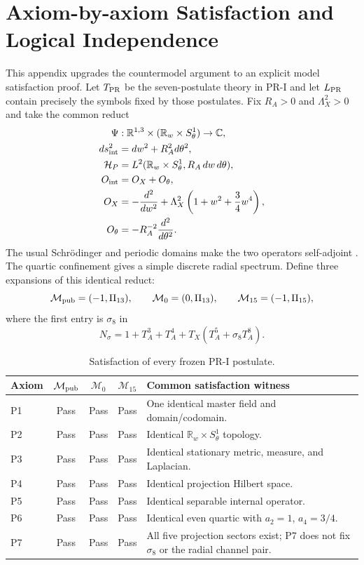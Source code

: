 \appendix
\section{Axiom-by-axiom Satisfaction and Logical Independence}
\label{app:axiom-by-axiom}

This appendix upgrades the countermodel argument to an explicit model
satisfaction proof.  Let $T_{\rm PR}$ be the seven-postulate theory in PR-I
and let $L_{\rm PR}$ contain precisely the symbols fixed by those postulates.
Fix $R_A>0$ and $\Lambda_X^2>0$ and take the common reduct
\begin{align}
 \Psi&:\mathbb R^{1,3}\times(\mathbb R_w\times S^1_\theta)\to\mathbb C,\\
 ds_{\rm int}^2&=dw^2+R_A^2d\theta^2,\\
 \mathcal H_P&=L^2(\mathbb R_w\times S^1_\theta,R_A\,dw\,d\theta),\\
 O_{\rm int}&=O_X+O_\theta,\\
 O_X&=-\frac{d^2}{dw^2}+\Lambda_X^2\left(1+w^2+\frac34w^4\right),\\
 O_\theta&=-R_A^{-2}\frac{d^2}{d\theta^2}.
\end{align}
The usual Schrödinger and periodic domains make the two operators self-adjoint \cite{ReedSimon_1975}.  The quartic confinement gives a simple discrete radial spectrum. Define three expansions of this identical reduct:
\begin{equation}
 \mathcal M_{\rm pub}=(-1,\Pi_{13}),\qquad
 \mathcal M_{0}=(0,\Pi_{13}),\qquad
 \mathcal M_{15}=(-1,\Pi_{15}),
\end{equation}
where the first entry is $\sigma_8$ in
\begin{equation}
 N_\sigma=1+T_A^3+T_A^4+T_X(T_A^5+\sigma_8T_A^8).
\end{equation}

\begin{table}[H]
\centering
\small
\caption{Satisfaction of every frozen PR-I postulate.}
\label{tab:axiom-satisfaction}
\begin{tabularx}{\textwidth}{@{}p{}c c c X@{}}
\toprule
Axiom & $\mathcal M_{\rm pub}$ & $\mathcal M_0$ & $\mathcal M_{15}$ & Common satisfaction witness \\
\midrule
P1 & Pass & Pass & Pass & One identical master field and domain/codomain. \\
P2 & Pass & Pass & Pass & Identical $\mathbb R_w\times S^1_\theta$ topology. \\
P3 & Pass & Pass & Pass & Identical stationary metric, measure, and Laplacian. \\
P4 & Pass & Pass & Pass & Identical projection Hilbert space. \\
P5 & Pass & Pass & Pass & Identical separable internal operator. \\
P6 & Pass & Pass & Pass & Identical even quartic with $a_2=1$, $a_4=3/4$. \\
P7 & Pass & Pass & Pass & All five projection sectors exist; P7 does not fix $\sigma_8$ or the radial channel pair. \\
\bottomrule
\end{tabularx}
\end{table}


